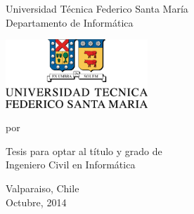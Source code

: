 \thispagestyle{empty}

\begin{center}

{\large\sc Universidad Técnica Federico Santa María}\\
{\large\sc Departamento de Informática}

\vspace{5mm}

\includegraphics[width=0.4\textwidth]{images/utfsm}
\end{center}


\begin{center}
    \begin{LARGE}
        \textbf{\titulo}
    \end{LARGE}
\end{center}


\begin{center}
{\large por}\\
{\huge \autor}
\end{center}



\begin{center}
{\large Tesis para optar al título y grado de}\\
\vspace*{10mm}
{\Large Ingeniero Civil en Informática}\\
\end{center}



\begin{center}
{\large Valparaiso, Chile}\\
{\large Octubre, 2014}\\[2mm]
\end{center}


\pagebreak

